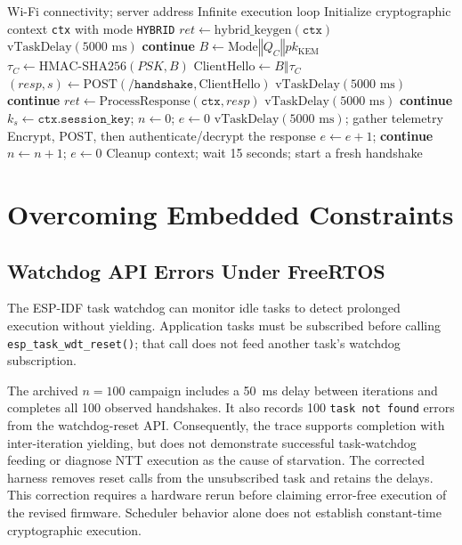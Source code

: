 \documentclass[journal, 10pt]{IEEEtran}
\begin{document}
\begin{algorithm}[!t]
\caption{Stateful Telemetry and Key Rotation Loop (\texttt{pqc\_task})}
\begin{algorithmic}[1]
\REQUIRE Wi-Fi connectivity; server address
\ENSURE Infinite execution loop
\WHILE{\TRUE}
    \STATE Initialize cryptographic context \texttt{ctx} with mode \texttt{HYBRID}
    \STATE $\mathit{ret} \leftarrow \text{hybrid\_keygen}(\texttt{ctx})$
        \STATE $\text{vTaskDelay}(5000\text{ ms})$ \textbf{continue}
    \ENDIF
    \STATE $B \leftarrow \text{Mode} \mathbin{\Vert} Q_C \mathbin{\Vert} pk_{\text{KEM}}$
    \STATE $\tau_C \leftarrow \text{HMAC-SHA256}(PSK,B)$
    \STATE $\text{ClientHello} \leftarrow B \mathbin{\Vert} \tau_C$
    \STATE $(\mathit{resp}, s) \leftarrow \text{POST}(\texttt{/handshake}, \text{ClientHello})$
        \STATE $\text{vTaskDelay}(5000\text{ ms})$ \textbf{continue}
    \ENDIF
    \STATE $\mathit{ret} \leftarrow \text{ProcessResponse}(\texttt{ctx},\mathit{resp})$
        \STATE $\text{vTaskDelay}(5000\text{ ms})$ \textbf{continue}
    \ENDIF
    \STATE $k_s \leftarrow \texttt{ctx.session\_key}$; $n \leftarrow 0$; $e \leftarrow 0$
        \STATE $\text{vTaskDelay}(5000\text{ ms})$; gather telemetry
        \STATE Encrypt, POST, then authenticate/decrypt the response
            \STATE $e \leftarrow e+1$; \textbf{continue}
        \ENDIF
        \STATE $n \leftarrow n+1$; $e \leftarrow 0$
    \ENDWHILE
    \STATE Cleanup context; wait 15 seconds; start a fresh handshake
\ENDWHILE
\end{algorithmic}
\end{algorithm}

\section{Overcoming Embedded Constraints}
\subsection{Watchdog API Errors Under FreeRTOS}
The ESP-IDF task watchdog can monitor idle tasks to detect prolonged execution without yielding. Application tasks must be subscribed before calling \texttt{esp\_task\_wdt\_reset()}; that call does not feed another task's watchdog subscription.

The archived $n=100$ campaign includes a 50~ms delay between iterations and completes all 100 observed handshakes. It also records 100 \texttt{task not found} errors from the watchdog-reset API. Consequently, the trace supports completion with inter-iteration yielding, but does not demonstrate successful task-watchdog feeding or diagnose NTT execution as the cause of starvation. The corrected harness removes reset calls from the unsubscribed task and retains the delays. This correction requires a hardware rerun before claiming error-free execution of the revised firmware. Scheduler behavior alone does not establish constant-time cryptographic execution.
\end{document}
